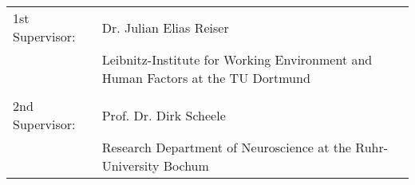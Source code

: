 \documentclass[12pt, titlepage]{article}
\begin{document}
\begin{titlepage}
\begin{center}
            \vspace{0.5cm}
            \begin{minipage}{0.8\textwidth}
                \begin{tabular}{p{} p{}}
                    1st Supervisor: & Dr. Julian Elias Reiser \\
                    & Leibnitz-Institute for Working Environment and Human Factors at the TU Dortmund \\
                    \\
                    2nd Supervisor: & Prof. Dr. Dirk Scheele \\
                    & Research Department of Neuroscience at the Ruhr-University Bochum \\
                \end{tabular}
            \end{minipage}
            
            \vspace{\fill}
        \end{center}
    \end{titlepage}


\fancyhead[L]{}
\pagestyle{fancy}
\newpage

\tableofcontents
\newpage

\listoffigures
\newpage

\listoftables
\newpage

\printacronyms  %
\newpage



\renewcommand{\sectionmark}[1]{\markboth{\textbf{\textsl{\thesection{} #1}}}{}}
\renewcommand{\subsectionmark}[1]{\markright{\textsl{\thesubsection{} #1}}}

\fancyhead[L]{\leftmark}
\justify


\printbibliography
\end{document}
